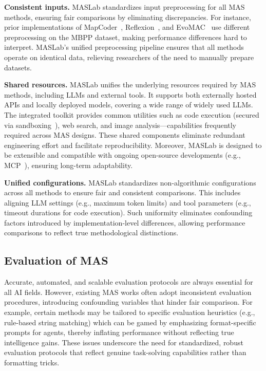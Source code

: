 \documentclass{article}
\begin{document}
\textbf{Consistent inputs.}
MASLab standardizes input preprocessing for all MAS methods, ensuring fair comparisons by eliminating discrepancies.
For instance, prior implementations of MapCoder~\cite{islam2024mapcoder}, Reflexion~\cite{shinn2023reflexion}, and EvoMAC~\cite{hu2025selfevolving} use different preprocessing on the MBPP dataset, making performance differences hard to interpret.
MASLab's unified preprocessing pipeline ensures that all methods operate on identical data, relieving researchers of the need to manually prepare datasets.

\textbf{Shared resources.}
MASLab unifies the underlying resources required by MAS methods, including LLMs and external tools. 
It supports both externally hosted APIs and locally deployed models, covering a wide range of widely used LLMs. 
The integrated toolkit provides common utilities such as code execution (secured via sandboxing~\cite{SandboxFusion}), web search, and image analysis—capabilities frequently required across MAS designs. 
These shared components eliminate redundant engineering effort and facilitate reproducibility. 
Moreover, MASLab is designed to be extensible and compatible with ongoing open-source developments (e.g., MCP~\cite{mcp}), ensuring long-term adaptability.

\textbf{Unified configurations.}
MASLab standardizes non-algorithmic configurations across all methods to ensure fair and consistent comparisons. 
This includes aligning LLM settings (e.g., maximum token limits) and tool parameters (e.g., timeout durations for code execution).
Such uniformity eliminates confounding factors introduced by implementation-level differences, allowing performance comparisons to reflect true methodological distinctions.

\subsection{Evaluation of MAS}

Accurate, automated, and scalable evaluation protocols are always essential for all AI fields.
However, existing MAS works often adopt inconsistent evaluation procedures, introducing confounding variables that hinder fair comparison.
For example, certain methods may be tailored to specific evaluation heuristics (e.g., rule-based string matching) which can be gamed by emphasizing format-specific prompts for agents, thereby inflating performance without reflecting true intelligence gains.
These issues underscore the need for standardized, robust evaluation protocols that reflect genuine task-solving capabilities rather than formatting tricks.
\end{document}
